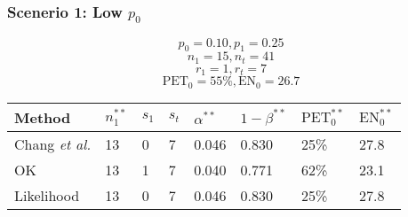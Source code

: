 \documentclass{beamer}\usepackage[]{graphicx}\usepackage[]{color}
\begin{document}
\begin{frame}
\frametitle{Scenerio 1: Low $p_0$}
$$p_0 = 0.10, p_1 = 0.25$$
$$n_1 = 15, n_t = 41$$
$$r_1 = 1, r_t = 7$$
$$\mbox{PET}_0 = 55\%, \mbox{EN}_0 = 26.7$$


\begin{table}[]
\begin{tabular}{llllllll}
Method                  & $n_1^{\ast\ast}$ & $s_1$ & $s_t$ & $\alpha^{\ast\ast}$ & $1-\beta^{\ast\ast}$ & $\mbox{PET}^{\ast\ast}_0$ & $\mbox{EN}^{\ast\ast}_0$ \\ \hline
Chang \textit{et al.} & 13               & 0     & 7     & 0.046                                 & 0.830                & 25\%                      & 27.8                     \\
OK                    & 13               & 1     & 7     & 0.040                                 & 0.771                & 62\%                      & 23.1                     \\
Likelihood              & 13               & 0     & 7     & 0.046                                 & 0.830                & 25\%                      & 27.8
\end{tabular}
\end{table}
\end{frame}

\end{document}
